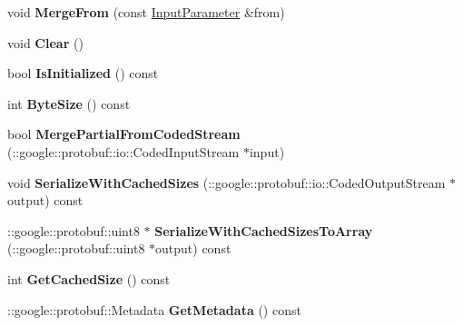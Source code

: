 \begin{DoxyCompactItemize}
\item 
\mbox{\label{classcaffe_1_1_input_parameter_aadbd380c130fe19d180eaf672f213aee}} 
void {\bfseries Merge\+From} (const \mbox{\hyperlink{classcaffe_1_1_input_parameter}{Input\+Parameter}} \&from)
\item 
\mbox{\label{classcaffe_1_1_input_parameter_ac0cc68374975b3977a5c23895f8cb7c5}} 
void {\bfseries Clear} ()
\item 
\mbox{\label{classcaffe_1_1_input_parameter_ac5f269ec2212895a146af569361848c2}} 
bool {\bfseries Is\+Initialized} () const
\item 
\mbox{\label{classcaffe_1_1_input_parameter_a0063a825e6b45cbef3846e10c7e441ff}} 
int {\bfseries Byte\+Size} () const
\item 
\mbox{\label{classcaffe_1_1_input_parameter_aab3affa1ae02125b7ddbcad57a15c8d7}} 
bool {\bfseries Merge\+Partial\+From\+Coded\+Stream} (\+::google\+::protobuf\+::io\+::\+Coded\+Input\+Stream $\ast$input)
\item 
\mbox{\label{classcaffe_1_1_input_parameter_a42b49dc166a375a80706fd44f28bb073}} 
void {\bfseries Serialize\+With\+Cached\+Sizes} (\+::google\+::protobuf\+::io\+::\+Coded\+Output\+Stream $\ast$output) const
\item 
\mbox{\label{classcaffe_1_1_input_parameter_aaae96ca0ca584b0c0336029378b227dc}} 
\+::google\+::protobuf\+::uint8 $\ast$ {\bfseries Serialize\+With\+Cached\+Sizes\+To\+Array} (\+::google\+::protobuf\+::uint8 $\ast$output) const
\item 
\mbox{\label{classcaffe_1_1_input_parameter_a8ae4be0b9e6bffc299997e50196760f1}} 
int {\bfseries Get\+Cached\+Size} () const
\item 
\mbox{\label{classcaffe_1_1_input_parameter_a6c03ea640ebf4c3247c199a40f696fb4}} 
\+::google\+::protobuf\+::\+Metadata {\bfseries Get\+Metadata} () const
\item 

\end{DoxyCompactItemize}
